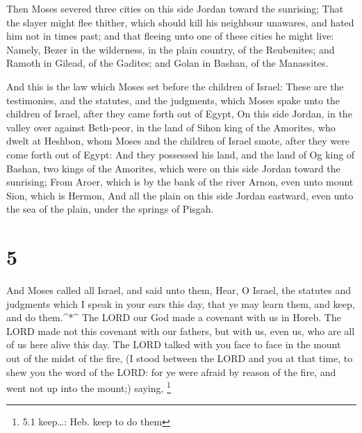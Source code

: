  Then Moses severed three cities on this side Jordan toward
the sunrising;  That the slayer might flee thither, which
should kill his neighbour unawares, and hated him not in times past; and
that fleeing unto one of these cities he might live: 
Namely, Bezer in the wilderness, in the plain country, of the
Reubenites; and Ramoth in Gilead, of the Gadites; and Golan in Bashan,
of the Manassites.

 And this is the law which Moses set before the children of
Israel:  These are the testimonies, and the statutes, and
the judgments, which Moses spake unto the children of Israel, after they
came forth out of Egypt,  On this side Jordan, in the
valley over against Beth-peor, in the land of Sihon king of the
Amorites, who dwelt at Heshbon, whom Moses and the children of Israel
smote, after they were come forth out of Egypt:  And they
possessed his land, and the land of Og king of Bashan, two kings of the
Amorites, which were on this side Jordan toward the sunrising;
 From Aroer, which is by the bank of the river Arnon, even
unto mount Sion, which is Hermon,  And all the plain on
this side Jordan eastward, even unto the sea of the plain, under the
springs of Pisgah.

\hypertarget{section-4}{%
\section{5}\label{section-4}}

 And Moses called all Israel, and said unto them, Hear, O
Israel, the statutes and judgments which I speak in your ears this day,
that ye may learn them, and keep, and do them.\^{}*\^{}  The
LORD our God made a covenant with us in Horeb.  The LORD
made not this covenant with our fathers, but with us, even us, who are
all of us here alive this day.  The LORD talked with you
face to face in the mount out of the midst of the fire,  (I
stood between the LORD and you at that time, to shew you the word of the
LORD: for ye were afraid by reason of the fire, and went not up into the
mount;) saying, \footnote{5.1 keep\ldots: Heb. keep to do them}

